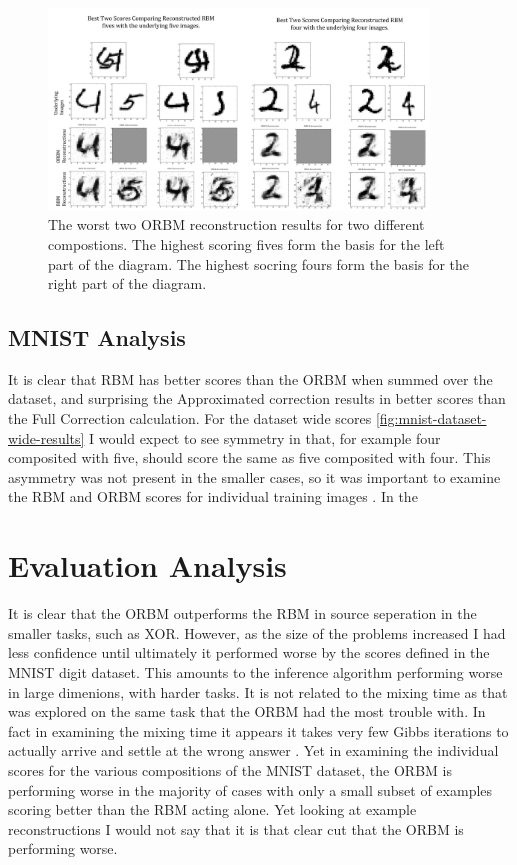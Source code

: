 \begin{figure}[htb]
  \begin{center}
    \includegraphics[width=0.9\textwidth]{Assets/results/orbm-Worst-2-results.png}
  \end{center}
  \caption{The worst two ORBM reconstruction results for two different compostions. The highest scoring fives form the basis for the left part of the diagram. The highest socring fours form the basis for the right part of the diagram.}
  \label{F:Worst-Results-MNIST}
\end{figure}


\subsection{MNIST Analysis}

It is clear that RBM has better scores than the ORBM when summed over the dataset, and surprising the Approximated correction results in better scores than the Full Correction calculation. For the dataset wide scores \ref{fig:mnist-dataset-wide-results} I would expect to see symmetry in that, for example four composited with five, should score the same as five composited with four.
This asymmetry was not present in the smaller cases, so it was important to examine the RBM and ORBM scores for individual training images \todocite{\ref{}}. In the


\section{Evaluation Analysis}

It is clear that the ORBM outperforms the RBM in source seperation in the smaller tasks, such as XOR. However, as the size of the problems increased I had less confidence until ultimately it performed worse by the scores defined in the MNIST digit dataset. This amounts to the inference algorithm performing worse in large dimenions, with harder tasks. It is not related to the mixing time as that was explored on the same task that the ORBM had the most trouble with. In fact in examining the mixing time it appears it takes very few Gibbs iterations to actually arrive and settle at the wrong answer \todocite{\ref{}}.
Yet in examining \todocite{\ref{}} the individual scores for the various compositions of the MNIST dataset, the ORBM is performing worse in the majority of cases with only a small subset of examples scoring better than the RBM acting alone. Yet looking at example reconstructions  I would not say that it is that clear cut that the ORBM is performing worse.

